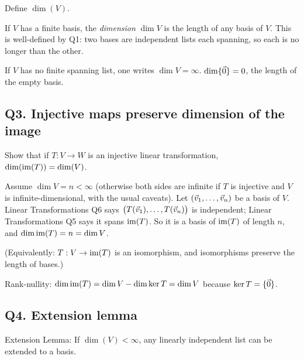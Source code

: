 \begin{promptbox}
Define $\dim(V)$.
\end{promptbox}

\begin{coursebox}
\begin{definition*}
If $V$ has a finite basis, the \emph{dimension} $\dim V$ is the length of any
basis of $V$. This is well-defined by Q1: two bases are independent lists each
spanning, so each is no longer than the other.

If $V$ has no finite spanning list, one writes $\dim V=\infty$.
$\dim\{\vec{0}\}=0$, the length of the empty basis.
\end{definition*}
\end{coursebox}

\subsection{Q3. Injective maps preserve dimension of the image}

\begin{promptbox}
Show that if $T:V\to W$ is an injective linear transformation,
$\dim(\operatorname{im}(T))=\dim(V)$.
\end{promptbox}

\begin{coursebox}
Assume $\dim V=n<\infty$ (otherwise both sides are infinite if $T$ is injective
and $V$ is infinite-dimensional, with the usual caveats). Let $(\vec{v}_1,\ldots,\vec{v}_n)$
be a basis of $V$. Linear Transformations Q6 says
$\bigl(T(\vec{v}_1),\ldots,T(\vec{v}_n)\bigr)$ is independent; Linear Transformations Q5
says it spans $\operatorname{im}(T)$. So it is a basis of $\operatorname{im}(T)$ of length $n$, and
$\dim\operatorname{im}(T)=n=\dim V$.

(Equivalently: $T:V\to\operatorname{im}(T)$ is an isomorphism, and isomorphisms preserve the
length of bases.)
\end{coursebox}

\begin{laterbox}
Rank-nullity: $\dim\operatorname{im}(T)=\dim V-\dim\ker T=\dim V$ because $\ker T=\{\vec{0}\}$.
\end{laterbox}

\subsection{Q4. Extension lemma}

\begin{promptbox}
Extension Lemma: If $\dim(V)<\infty$, any linearly independent list can be
extended to a basis.
\end{promptbox}

